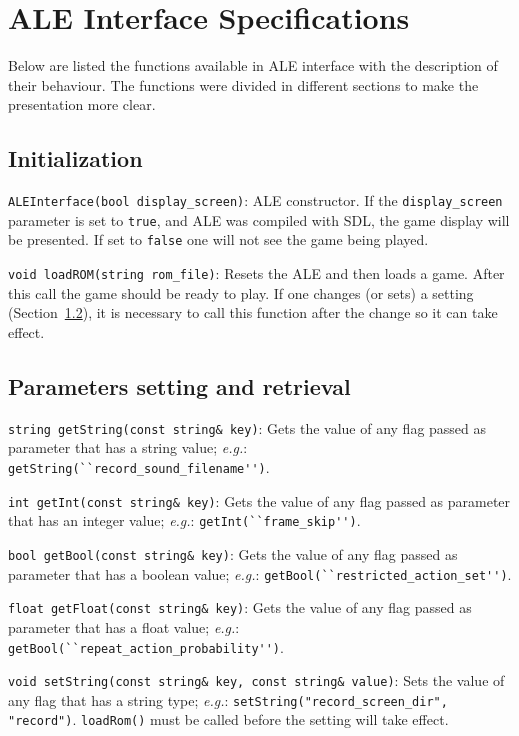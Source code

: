 \documentclass[12pt]{article}
\begin{document}
\section{ALE Interface Specifications}\label{sec:functions}

Below are listed the functions available in ALE interface with the description of their 
behaviour. The functions were divided in different sections to make the presentation more
clear.

  \subsection{Initialization}

  \indent \indent \verb+ALEInterface(bool display_screen)+: ALE constructor. If the 
  \verb+display_screen+ parameter is set to \verb+true+, and ALE was compiled
  with SDL, the game display will be presented. If set to \verb+false+ one will not see
  the game being played.
  
  \verb+void loadROM(string rom_file)+: Resets the ALE and then loads a game. After this call
  the game should be ready to play. If one changes (or sets) a setting (Section~\ref{sec:getSet}), 
  it is necessary to call this function after the change so it can take effect.
  
  \subsection{Parameters setting and retrieval}\label{sec:getSet}
  
  \indent \indent \verb+string getString(const string& key)+: Gets the value of any flag passed
  as parameter that has a string value; \emph{e.g.}: \verb+getString(``record_sound_filename'')+.

  \verb+int getInt(const string& key)+: Gets the value of any flag passed as parameter that has 
  an integer value; \emph{e.g.}: \verb+getInt(``frame_skip'')+.

  \verb+bool getBool(const string& key)+: Gets the value of any flag passed as parameter that has 
  a boolean value; \emph{e.g.}: \verb+getBool(``restricted_action_set'')+. 
  
  \verb+float getFloat(const string& key)+: Gets the value of any flag passed as parameter that has 
  a float value; \emph{e.g.}: \verb+getBool(``repeat_action_probability'')+.   
  
  \verb+void setString(const string& key, const string& value)+: Sets the value of any flag
  that has a string type; \emph{e.g.}: \verb+setString("record_screen_dir", "record")+.
  \verb+loadRom()+ must be called before the setting will take effect.
  
\end{document}
